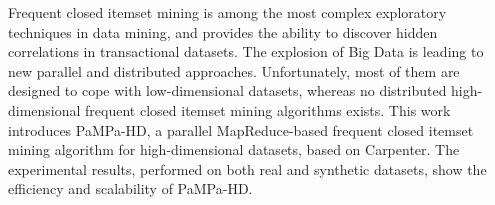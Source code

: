 Frequent closed itemset mining is among the most complex exploratory techniques in data mining, 
and provides the ability to discover hidden correlations in transactional datasets.
The explosion of Big Data is leading to new parallel and distributed approaches. 
Unfortunately, most of them are designed to cope with low-dimensional datasets,
whereas no distributed high-dimensional frequent closed itemset mining algorithms exists. 
This work introduces PaMPa-HD, 
a parallel MapReduce-based frequent closed itemset mining algorithm 
for high-dimensional datasets, based on Carpenter. 
The experimental results, performed on both real and synthetic datasets, 
show the efficiency and scalability of PaMPa-HD.

